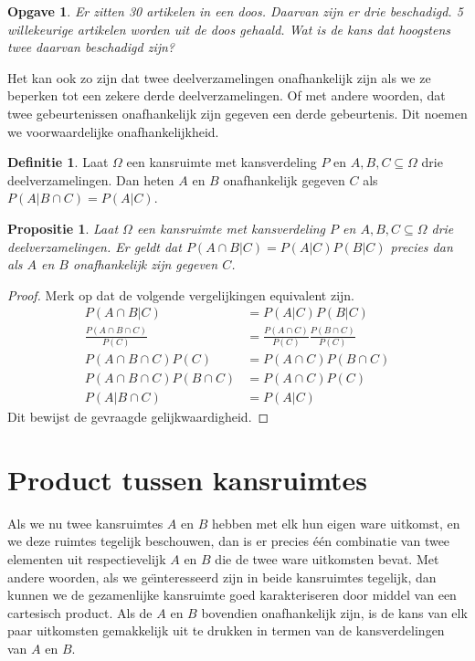 \documentclass[a4paper]{book}
\newtheorem{proposition}[theorem]{Propositie}
\newtheorem{exercise}[theorem]{Opgave}
\theoremstyle{definition}
\newtheorem{definition}[theorem]{Definitie}
\begin{document}
\begin{exercise}
Er zitten 30 artikelen in een doos. Daarvan zijn er drie beschadigd.
5 willekeurige artikelen worden uit de doos gehaald. Wat is de kans dat hoogstens twee daarvan beschadigd zijn?
\end{exercise}

Het kan ook zo zijn dat twee deelverzamelingen onafhankelijk zijn als we ze beperken tot een zekere derde deelverzamelingen.
Of met andere woorden, dat twee gebeurtenissen onafhankelijk zijn gegeven een derde gebeurtenis.
Dit noemen we voorwaardelijke onafhankelijkheid.
\begin{definition}
    Laat $\Omega$ een kansruimte met kansverdeling $P$ en $A,B,C \subseteq \Omega$ drie deelverzamelingen.
    Dan heten $A$ en $B$ onafhankelijk gegeven $C$ als $P(A|B \cap C) = P(A|C)$.
\end{definition}

\begin{proposition}
    Laat $\Omega$ een kansruimte met kansverdeling $P$ en $A,B,C \subseteq \Omega$ drie deelverzamelingen.
    Er geldt dat $P(A \cap B|C) = P(A|C)P(B|C)$ precies dan als $A$ en $B$ onafhankelijk zijn gegeven $C$.
\end{proposition}
\begin{proof}
    Merk op dat de volgende vergelijkingen equivalent zijn.
    \begin{align*}
        P(A \cap B|C)                       &= P(A|C)P(B|C) \\
        \frac{P(A \cap B \cap C)}{P(C)}     &= \frac{P(A \cap C)}{P(C)} \frac{P(B \cap C)}{P(C)} \\
        P(A \cap B \cap C)P(C)              &= P(A \cap C)P(B \cap C) \\
        P(A \cap B \cap C)P(B \cap C)       &= P(A \cap C)P(C) \\
        P(A | B \cap C)                     &= P(A | C)
    \end{align*}
    Dit bewijst de gevraagde gelijkwaardigheid.
\end{proof}


\section{Product tussen kansruimtes}
Als we nu twee kansruimtes $A$ en $B$ hebben met elk hun eigen ware uitkomst, en we deze ruimtes tegelijk beschouwen, dan is er precies \'e\'en
combinatie van twee elementen uit respectievelijk $A$ en $B$ die de twee ware uitkomsten bevat.
Met andere woorden, als we ge\"{\i}nteresseerd zijn in beide kansruimtes tegelijk, dan kunnen we de gezamenlijke kansruimte goed karakteriseren
door middel van een cartesisch product.
Als de $A$ en $B$ bovendien onafhankelijk zijn, is de kans van elk paar uitkomsten gemakkelijk uit te drukken in termen van de kansverdelingen van $A$
en $B$.
\end{document}
